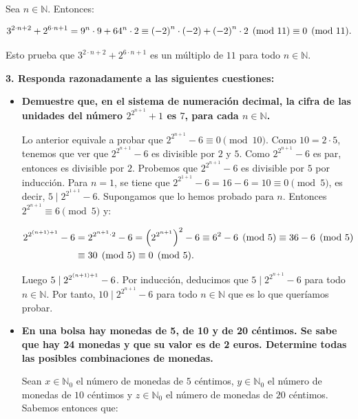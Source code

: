 Sea $n\in\mathbb{N}$. Entonces:

\begin{equation}
  \begin{split}
    3^{2\cdot n+2}+2^{6\cdot n+1}=9^n\cdot 9+64^n\cdot 2\equiv\left(-2\right)^n\cdot\left(-2\right)+\left(-2\right)^n\cdot 2\pmod{11}\equiv 0\pmod{11}.
  \end{split}
\end{equation}

Esto prueba que $3^{2\cdot n+2}+2^{6\cdot n+1}$ es un múltiplo de $11$ para todo $n\in\mathbb{N}$.

\textbf{3. Responda razonadamente a las siguientes cuestiones:}

\begin{itemize}
  \item[\textbf{(1)}] \textbf{Demuestre que, en el sistema de numeración decimal, la cifra de las unidades del número $2^{2^{n+1}}+1$ es $7$, para cada $n\in\mathbb{N}$.}
  
  Lo anterior equivale a probar que $2^{2^{n+1}}-6\equiv 0\pmod{10}$. Como $10=2\cdot 5$, tenemos que ver que $2^{2^{n+1}}-6$ es divisible por $2$ y $5$. Como $2^{2^{n+1}}-6$ es par, entonces es divisible por $2$. Probemos que $2^{2^{n+1}}-6$ es divisible por $5$ por inducción. Para $n=1$, se tiene que $2^{2^{1+1}}-6=16-6=10\equiv 0\pmod{5}$, es decir, $5\mid 2^{2^{1+1}}-6$. Supongamos que lo hemos probado para $n$. Entonces $2^{2^{n+1}}\equiv 6\pmod{5}$ y:

  \begin{equation}
    \begin{split}
      2^{2^{\left(n+1\right)+1}}-6& =2^{2^{n+1}\cdot 2}-6=\left(2^{2^{n+1}}\right)^2-6\equiv 6^2-6\pmod{5}\equiv 36-6\pmod{5}\\
      & \equiv 30\pmod{5}\equiv 0\pmod{5}.
    \end{split}
  \end{equation}

  Luego $5\mid2^{2^{\left(n+1\right)+1}}-6$. Por inducción, deducimos que $5\mid2^{2^{n+1}}-6$ para todo $n\in\mathbb{N}$. Por tanto, $10\mid 2^{2^{n+1}}-6$ para todo $n\in\mathbb{N}$ que es lo que queríamos probar.

  \item[\textbf{(2)}] \textbf{En una bolsa hay monedas de 5, de 10 y de 20 céntimos. Se sabe que hay 24 monedas y que su valor es de 2 euros. Determine todas las posibles combinaciones de monedas.}
  

  Sean $x\in\mathbb{N}_0$ el número de monedas de $5$ céntimos, $y\in\mathbb{N}_0$ el número de monedas de $10$ céntimos y $z\in\mathbb{N}_0$ el número de monedas de $20$ céntimos. Sabemos entonces que:


\end{itemize}
